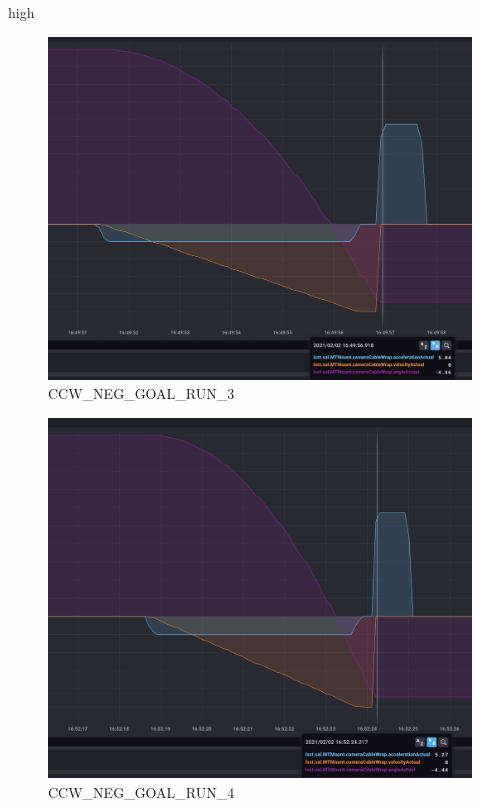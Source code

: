 high\documentclass[SE,lsstdraft,authoryear,toc]{lsstdoc}
\begin{document}
\begin{figure}[h!]
  \includegraphics[width=\linewidth]{media/CCW_high_speed_neg_test3.png}
  \caption{CCW\_NEG\_GOAL\_RUN\_3}
  \label{fig:CCW_NEG_GOAL_RUN_3}
\end{figure}
\begin{figure}[h!]
  \includegraphics[width=\linewidth]{media/CCW_high_speed_neg_test4.png}
  \caption{CCW\_NEG\_GOAL\_RUN\_4}
  \label{fig:CCW_NEG_GOAL_RUN_4}
\end{figure}
\end{document}
